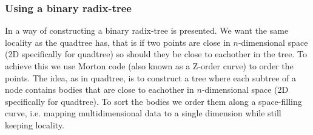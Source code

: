 \subsubsection{Using a binary radix-tree}
In \cite{main-ref} a way of constructing a binary radix-tree is presented. We
want the same locality as the quadtree has, that is if two points are close in
$n$-dimensional space (2D specifically for quadtree) so should they be close to
eachother in the tree. To achieve this we use Morton code (also known as a
Z-order curve) \cite{wiki:morton} to order the points. The idea, as in
quadtree, is to construct a tree where each subtree of a node contains bodies
that are close to eachother in $n$-dimensional space (2D specifically for
quadtree). To sort the bodies we order them along a space-filling curve, i.e.
mapping multidimensional data to a single dimension while still keeping
locality.

